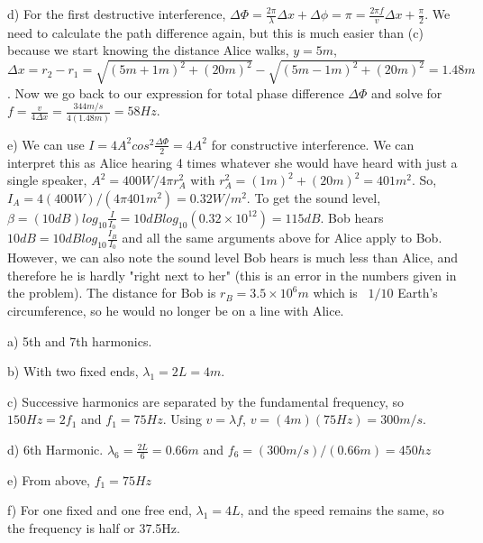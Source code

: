 \documentclass[10pt]{article}
\newenvironment{problem}[2][Problem]{\begin{trivlist}
\item[\hskip \labelsep {\bfseries #1}\hskip \labelsep {\bfseries #2.}]}{\end{trivlist}}
\begin{document}
\begin{problem}{3}
\item d) For the first destructive interference, $\Delta \Phi = \frac{2\pi}{\lambda}\Delta x + \Delta \phi = \pi = \frac{2\pi f}{v}\Delta x + \frac{\pi}{2}$. We need to calculate the path difference again, but this is much easier than (c) because we start knowing the distance Alice walks, $y=5m$, $\Delta x = r_2 - r_1 = \sqrt{(5m+1m)^2 + (20m)^2} - \sqrt{(5m-1m)^2 + (20m)^2} = 1.48m$. Now we go back to our expression for total phase difference $\Delta \Phi$ and solve for $f = \frac{v}{4\Delta x} = \frac{344 m/s}{4(1.48m)}=58Hz$.

\item e)  We can use $I = 4A^2 cos^2\frac{\Delta \Phi}{2}=4A^2$ for constructive interference. We can interpret this as Alice hearing 4 times whatever she would have heard with just a single speaker, $A^2 = 400W/4\pi r^2_A$ with $r^2_A=(1m)^2+(20m)^2=401m^2$. So, $I_A = 4(400W)/(4\pi 401m^2)=0.32W/m^2$. To get the sound level, $\beta = (10dB) log_{10} \frac{I}{I_0} = 10dB log_{10}(0.32 \times 10^{12})=115dB$. Bob hears $10dB =10dBlog_{10} \frac{I_B}{I_0}$ and all the same arguments above for Alice apply to Bob. However, we can also note the sound level Bob hears is much less than Alice, and therefore he is hardly "right next to her" (this is an error in the numbers given in the problem). The distance for Bob is $r_B=3.5\times10^6m$ which is ~$1/10$ Earth's circumference, so he would no longer be on a line with Alice.

\end{problem}

\begin{problem}{4}
\item a) 5th and 7th harmonics.

\item b) With two fixed ends, $\lambda_1 = 2L=4m$.
\item c) Successive harmonics are separated by the fundamental frequency, so $150Hz=2f_1$ and $f_1=75Hz$. Using $v=\lambda f$, $v=(4m)(75Hz)=300m/s$.
\item d) 6th Harmonic. $\lambda_6=\frac{2L}{6}=0.66m$ and $f_6=(300m/s)/(0.66m)=450hz$
\item e) From above, $f_1=75Hz$
\item f) For one fixed and one free end, $\lambda_1=4L$, and the speed remains the same, so the frequency is half or 37.5Hz.
\end{problem}
\end{document}
